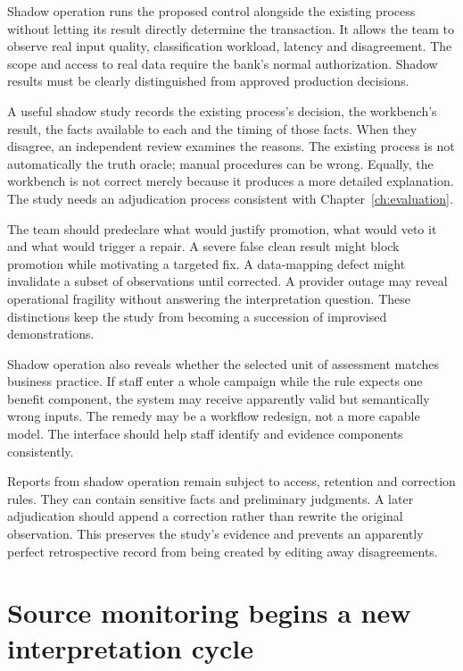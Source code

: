 Shadow operation runs the proposed control alongside the existing process without
letting its result directly determine the transaction. It allows the team to
observe real input quality, classification workload, latency and disagreement.
The scope and access to real data require the bank's normal authorization.
Shadow results must be clearly distinguished from approved production decisions.

A useful shadow study records the existing process's decision, the workbench's
result, the facts available to each and the timing of those facts. When they
disagree, an independent review examines the reasons. The existing process is not
automatically the truth oracle; manual procedures can be wrong. Equally, the
workbench is not correct merely because it produces a more detailed explanation.
The study needs an adjudication process consistent with Chapter~\ref{ch:evaluation}.


The team should predeclare what would justify promotion, what would veto it and
what would trigger a repair. A severe false clean result might block promotion
while motivating a targeted fix. A data-mapping defect might invalidate a subset
of observations until corrected. A provider outage may reveal operational
fragility without answering the interpretation question. These distinctions keep
the study from becoming a succession of improvised demonstrations.

Shadow operation also reveals whether the selected unit of assessment matches
business practice. If staff enter a whole campaign while the rule expects one
benefit component, the system may receive apparently valid but semantically wrong
inputs. The remedy may be a workflow redesign, not a more capable model. The
interface should help staff identify and evidence components consistently.

Reports from shadow operation remain subject to access, retention and correction
rules. They can contain sensitive facts and preliminary judgments. A later
adjudication should append a correction rather than rewrite the original
observation. This preserves the study's evidence and prevents an apparently
perfect retrospective record from being created by editing away disagreements.

\section{Source monitoring begins a new interpretation cycle}
\label{merge:M10:04}


